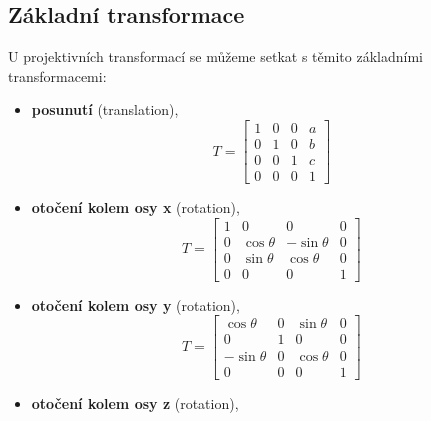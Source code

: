 \subsection{Základní transformace}
U projektivních transformací se můžeme setkat s těmito základními transformacemi:
\begin{itemize}
    \item \textbf{posunutí} (translation),
          \begin{equation*}
              T = \begin{bmatrix}
                  1 & 0 & 0 & a \\[0.3em]
                  0 & 1 & 0 & b \\[0.3em]
                  0 & 0 & 1 & c \\[0.3em]
                  0 & 0 & 0 & 1
              \end{bmatrix}
          \end{equation*}
    \item \textbf{otočení kolem osy x} (rotation),
          \begin{equation*}
              T = 	\begin{bmatrix}
                  1 & 0            & 0             & 0 \\[0.3em]
                  0 & \cos{\theta} & -\sin{\theta} & 0 \\[0.3em]
                  0 & \sin{\theta} & \cos{\theta}  & 0 \\[0.3em]
                  0 & 0            & 0             & 1
              \end{bmatrix}
          \end{equation*}
    \item \textbf{otočení kolem osy y} (rotation),
          \begin{equation*}
              T = 	\begin{bmatrix}
                  \cos{\theta}  & 0 & \sin{\theta} & 0 \\[0.3em]
                  0             & 1 & 0            & 0 \\[0.3em]
                  -\sin{\theta} & 0 & \cos{\theta} & 0 \\[0.3em]
                  0             & 0 & 0            & 1
              \end{bmatrix}
          \end{equation*}
    \item \textbf{otočení kolem osy z} (rotation),
          \begin{equation*}

\end{equation*}
\end{itemize}
